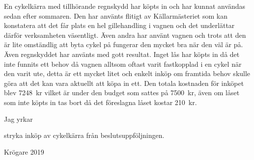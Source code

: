 \documentclass[../_main/handlingar.tex]{subfiles}
\begin{document}

    En cykelkärra med tillhörande regnskydd har köpts in och har kunnat användas sedan efter sommaren. Den har använts flitigt av Källarmästeriet som kan konstatera att det får plats en hel gillehandling i vagnen och det underlättar därför verksamheten väsentligt. Även andra har använt vagnen och trots att den är lite omständlig att byta cykel på fungerar den mycket bra när den väl är på. Även regnskyddet har använts med gott resultat. Inget lås har köpts in då det inte funnits ett behov då vagnen alltsom oftast varit fastkopplad i en cykel när den varit ute, detta är ett mycket litet och enkelt inköp om framtida behov skulle göra att det kan vara aktuellt att köpa in ett. Den totala kostnaden för inköpet blev \SI{7248}{kr} vilket är under den budget som sattes på \SI{7500}{kr}, även om låset som inte köpts in tas bort då det föreslagna låset kostar \SI{210}{kr}. 

    Jag yrkar 

\begin{attsatser}
    \att stryka inköp av cykelkärra från beslutsuppföljningen.
\end{attsatser}

\begin{signatures}{}
    \signature{Davida Åström}{Krögare 2019}
\end{signatures}
\end{document}
